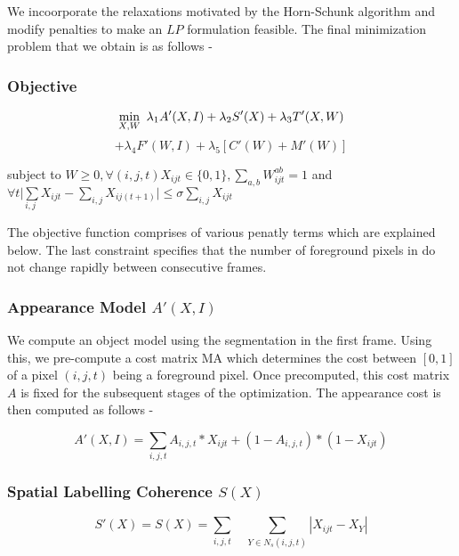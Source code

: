 We incoorporate the relaxations motivated by the Horn-Schunk algorithm
and modify penalties to make an $LP$ formulation feasible. The final
minimization problem that we obtain is as follows -


\subsubsection*{Objective}

\begin{equation}
\underset{X,W}{\min}\enskip\lambda_{1}A'(X,I)+\lambda_{2}S'(X)+\lambda_{3}T'(X,W)
\end{equation}
\[
+\lambda_{4}F'(W,I)+\lambda_{5}[C'(W)+M'(W)]
\]


\begin{center}
subject to $W\geq0,\forall(i,j,t)X_{ijt}\in\{0,1\},\underset{a,b}{\sum}W_{ijt}^{ab}=1$
and $\forall t\underset{i,j}{|\sum}X_{ijt}-\underset{i,j}{\sum}X_{ij(t+1)}|\leq\sigma\underset{i,j}{\sum}X_{ijt}$ 
\par\end{center}

\noindent The objective function comprises of various penatly terms
which are explained below. The last constraint specifies that the
number of foreground pixels in do not change rapidly between consecutive
frames.


\subsubsection*{Appearance Model $A'(X,I)$}

We compute an object model using the segmentation in the first frame.
Using this, we pre-compute a cost matrix MA which determines the cost
between $[0,1]$ of a pixel $(i,j,t)$ being a foreground pixel. Once
precomputed, this cost matrix $A$ is fixed for the subsequent stages
of the optimization. The appearance cost is then computed as follows
-

\begin{equation}
A'(X,I)=\underset{i,j,t}{\sum}A_{i,j,t}*X_{ijt}+(1-A_{i,j,t})*(1-X_{ijt})
\end{equation}



\subsubsection*{Spatial Labelling Coherence $S(X)$}

\begin{equation}
S'(X)=S(X)=\underset{i,j,t}{\sum}\quad\underset{Y\in N_{s}(i,j,t)}{\sum}|X_{ijt}-X_{Y}|
\end{equation}




